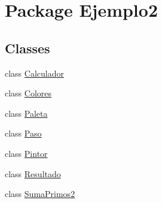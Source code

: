 \hypertarget{namespace_ejemplo2}{}\section{Package Ejemplo2}
\label{namespace_ejemplo2}
\subsection*{Classes}
\begin{DoxyCompactItemize}
\item 
class \mbox{\hyperlink{class_ejemplo2_1_1_calculador}{Calculador}}
\item 
class \mbox{\hyperlink{class_ejemplo2_1_1_colores}{Colores}}
\item 
class \mbox{\hyperlink{class_ejemplo2_1_1_paleta}{Paleta}}
\item 
class \mbox{\hyperlink{class_ejemplo2_1_1_paso}{Paso}}
\item 
class \mbox{\hyperlink{class_ejemplo2_1_1_pintor}{Pintor}}
\item 
class \mbox{\hyperlink{class_ejemplo2_1_1_resultado}{Resultado}}
\item 
class \mbox{\hyperlink{class_ejemplo2_1_1_suma_primos2}{Suma\+Primos2}}
\end{DoxyCompactItemize}
